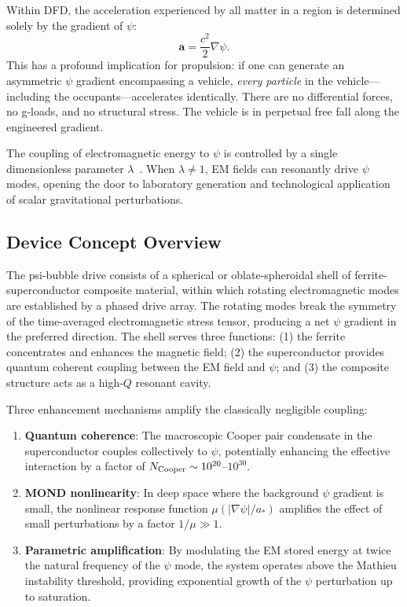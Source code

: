 \documentclass[twocolumn,prl,superscriptaddress,nofootinbib,longbibliography,floatfix]{revtex4-2}
\newcommand{\avec}{\mathbf{a}}
\newcommand{\astar}{a_*}
\begin{document}
Within DFD, the acceleration experienced by all matter in a region is
determined solely by the gradient of $\psi$:
\begin{equation}
\avec = \frac{c^2}{2}\nabla\psi.
\label{eq:accel}
\end{equation}
This has a profound implication for propulsion: if one can generate an
asymmetric $\psi$ gradient encompassing a vehicle, \emph{every particle}
in the vehicle---including the occupants---accelerates identically.
There are no differential forces, no g-loads, and no structural stress.
The vehicle is in perpetual free fall along the engineered gradient.

The coupling of electromagnetic energy to $\psi$ is controlled by a
single dimensionless parameter $\lambda$~\cite{Alcock2025EMcoupling}.
When $\lambda \neq 1$, EM fields can resonantly drive $\psi$ modes,
opening the door to laboratory generation and technological application
of scalar gravitational perturbations.

\subsection{Device Concept Overview}

The psi-bubble drive consists of a spherical or oblate-spheroidal shell
of ferrite-superconductor composite material, within which rotating
electromagnetic modes are established by a phased drive array.  The
rotating modes break the symmetry of the time-averaged electromagnetic
stress tensor, producing a net $\psi$ gradient in the preferred
direction.  The shell serves three functions: (1) the ferrite
concentrates and enhances the magnetic field; (2) the superconductor
provides quantum coherent coupling between the EM field and $\psi$; and
(3) the composite structure acts as a high-$Q$ resonant cavity.

Three enhancement mechanisms amplify the classically negligible
coupling:
\begin{enumerate}[nosep]
\item \textbf{Quantum coherence}: The macroscopic Cooper pair condensate
in the superconductor couples collectively to $\psi$, potentially
enhancing the effective interaction by a factor of
$N_{\rm Cooper} \sim 10^{20}$--$10^{30}$.
\item \textbf{MOND nonlinearity}: In deep space where the background
$\psi$ gradient is small, the nonlinear response function
$\mu(|\nabla\psi|/\astar)$ amplifies the effect of small perturbations
by a factor $1/\mu \gg 1$.
\item \textbf{Parametric amplification}: By modulating the EM stored
energy at twice the natural frequency of the $\psi$ mode, the system
operates above the Mathieu instability threshold, providing exponential
growth of the $\psi$ perturbation up to saturation.
\end{enumerate}
\end{document}
